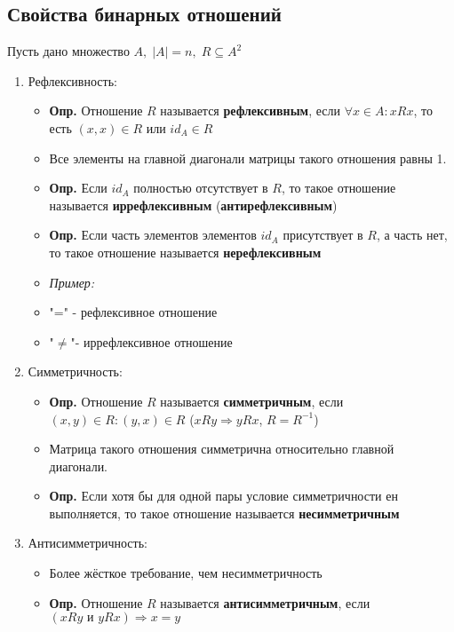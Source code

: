 \documentclass[10pt]{article}
\begin{document}
\subsection*{Свойства бинарных отношений}
\par Пусть дано множество $A, \; |A| = n, \; R \subseteq A^2$
\begin{enumerate}
    \item Рефлексивность:
        \begin{itemize}
            \item \textbf{Опр.} Отношение $R$ называется \textbf{рефлексивным}, если $\forall x \in A: xRx$, то есть $(x, x) \in R$ или $id_{A} \in R$
            \item[] Все элементы на главной диагонали матрицы такого отношения равны 1.
            \item \textbf{Опр.} Если $id_{A}$ полностью отсутствует в $R$, то такое отношение называется \textbf{иррефлексивным} (\textbf{антирефлексивным})
            \item \textbf{Опр.} Если часть элементов элементов $id_A$ присутствует в $R$, а часть нет, то такое отношение называется \textbf{нерефлексивным}
            \item \textit{Пример:}
            \item[] "=" - рефлексивное отношение
            \item[] "$\neq$"- иррефлексивное отношение
        \end{itemize}
    \item Симметричность:
        \begin{itemize}
            \item \textbf{Опр.} Отношение $R$ называется \textbf{симметричным}, если $(x, y) \in R: (y, x) \in R$  ($xRy \Rightarrow yRx$, $R = R^{-1}$)
            \item Матрица такого отношения симметрична относительно главной диагонали.
            \item\textbf{Опр.} Если хотя бы для одной пары условие симметричности ен выполняется, то такое отношение называется \textbf{несимметричным}
        \end{itemize}
    \item Антисимметричность:
        \begin{itemize}
            \item Более жёсткое требование, чем несимметричность
            \item\textbf{Опр.} Отношение $R$ называется \textbf{антисимметричным}, если $(xRy \text{ и } yRx) \Rightarrow x = y$

\end{itemize}
\end{enumerate}
\end{document}
